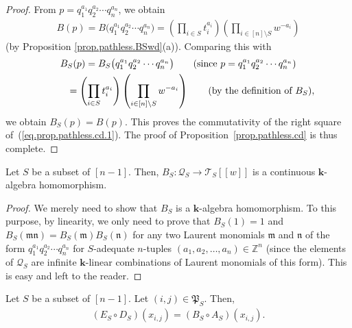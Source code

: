 \begin{proof}
From $p=q_{1}^{a_{1}}q_{2}^{a_{2}}\cdots q_{n}^{a_{n}}$, we obtain
\begin{gather*}
B(p) =B\big( q_{1}^{a_{1}}q_{2}^{a_{2}}\cdots q_{n}^{a_{n}}\big) =\left( \prod_{i\in S}t_{i}^{a_{i}}\right) \left( \prod _{i\in[n] \setminus S}w^{-a_{i}}\right)
\end{gather*}
(by Proposition \ref{prop.pathless.BSwd}(a)). Comparing this with
\begin{gather*}
B_{S}(p)=B_{S}\big( q_{1}^{a_{1}}q_{2}^{a_{2}}\cdots q_{n}^{a_{n}}\big) \qquad ( \text{since }p=q_{1}^{a_{1}}q_{2}^{a_{2}}\cdots q_{n}^{a_{n}}) \\
\hphantom{B_{S}(p)}{} =\left( \prod_{i\in S}t_{i}^{a_{i}}\right) \left( \prod_{i\in [n] \setminus S}w^{-a_{i}}\right) \qquad ( \text{by the definition of }B_{S}) ,
\end{gather*}
we obtain $B_{S}(p) =B(p) $. This proves the commutativity of the right square of~(\ref{eq.prop.pathless.cd.1}). The proof of Proposition~\ref{prop.pathless.cd} is thus complete.
\end{proof}

\begin{Proposition}\label{prop.pathless.BS-alg}Let $S$ be a subset of $[n-1] $. Then, $B_{S}\colon \mathcal{Q}_{S}\rightarrow\mathcal{T}_{S} [ [ w] ] $ is a continuous $\mathbf{k}$-algebra homomorphism.
\end{Proposition}

\begin{proof}We merely need to show that $B_{S}$ is a $\mathbf{k}$-algebra homomorphism. To this purpose, by linearity, we only need to prove that $B_{S}(1) =1$ and $B_{S}( \mathfrak{mn}) =B_{S}( \mathfrak{m}) B_{S}(\mathfrak{n}) $ for any two Laurent monomials $\mathfrak{m}$ and $\mathfrak{n}$ of the form $q_{1}^{a_{1}}q_{2}^{a_{2}}\cdots q_{n}^{a_{n}}$ for $S$-adequate $n$-tuples $( a_{1},a_{2},\ldots,a_{n}) \in\mathbb{Z}^{n}$ (since the elements of $\mathcal{Q}_{S}$ are infinite $\mathbf{k}$-linear combinations of Laurent monomials of this form). This is easy and left to the reader.
\end{proof}

\begin{Proposition}\label{prop.pathless.AB}Let $S$ be a subset of $[n-1] $. Let $(i,j) \in\mathfrak{P}_{S}$. Then,
\begin{gather*}
 ( E_{S}\circ D_{S} ) (x_{i,j}) = ( B_{S}\circ A_{S} ) ( x_{i,j} ) .
\end{gather*}
\end{Proposition}

